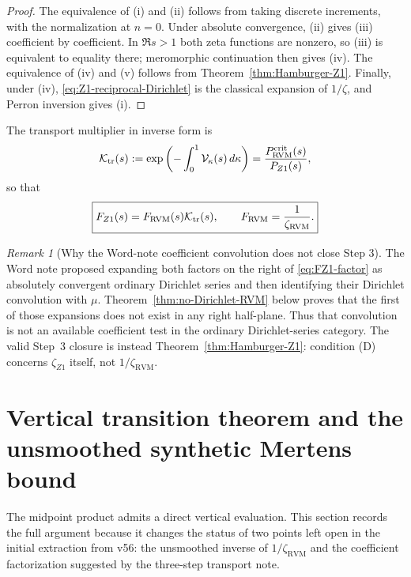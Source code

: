 \documentclass[11pt,reqno]{amsart}
\theoremstyle{definition}
\theoremstyle{remark}
\newtheorem{remark}[theorem]{Remark}
\newcommand{\RVM}{\mathrm{RVM}}
\newcommand{\crit}{\mathrm{crit}}
\begin{document}
\begin{proof}
The equivalence of (i) and (ii) follows from taking discrete increments, with the normalization at $n=0$.  Under absolute convergence, (ii) gives (iii) coefficient by coefficient.  In $\Re s>1$ both zeta functions are nonzero, so (iii) is equivalent to equality there; meromorphic continuation then gives (iv).  The equivalence of (iv) and (v) follows from Theorem~\ref{thm:Hamburger-Z1}.  Finally, under (iv), \eqref{eq:Z1-reciprocal-Dirichlet} is the classical expansion of $1/\zeta$, and Perron inversion gives (i).
\end{proof}

The transport multiplier in inverse form is
\begin{equation}\label{eq:Ktransport}
 \mathcal K_{\rm tr}(s)
 :=\exp\left(-\int_0^1\mathcal V_\kappa(s)\,d\kappa\right)
 =\frac{P_{\RVM}^{\crit}(s)}{P_{Z1}(s)},
\end{equation}
so that
\begin{equation}\label{eq:FZ1-factor}
 \boxed{
 F_{Z1}(s)=F_{\RVM}(s)\mathcal K_{\rm tr}(s),
 \qquad F_{\RVM}=\frac1{\zeta_{\RVM}}.}
\end{equation}

\begin{remark}[Why the Word-note coefficient convolution does not close Step 3]\label{rem:word-coefficient-route}
The Word note proposed expanding both factors on the right of \eqref{eq:FZ1-factor} as absolutely convergent ordinary Dirichlet series and then identifying their Dirichlet convolution with $\mu$.  Theorem~\ref{thm:no-Dirichlet-RVM} below proves that the first of those expansions does not exist in any right half-plane.  Thus that convolution is not an available coefficient test in the ordinary Dirichlet-series category.  The valid Step~3 closure is instead Theorem~\ref{thm:Hamburger-Z1}: condition (D) concerns $\zeta_{Z1}$ itself, not $1/\zeta_{\RVM}$.
\end{remark}

\section{Vertical transition theorem and the unsmoothed synthetic Mertens bound}
\label{sec:transition}

The midpoint product admits a direct vertical evaluation.  This section records the full argument because it changes the status of two points left open in the initial extraction from v56: the unsmoothed inverse of $1/\zeta_{\RVM}$ and the coefficient factorization suggested by the three-step transport note.
\end{document}
